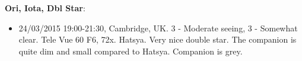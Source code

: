{\bf Ori, Iota, Dbl Star}:
\begin{itemize}
\item 24/03/2015 19:00-21:30, Cambridge, UK. 3 - Moderate seeing, 3 - Somewhat clear. Tele Vue 60 F6, 72x. Hatsya. Very nice double star. The companion is quite dim and small compared to Hatsya. Companion is grey. 
\end{itemize}
